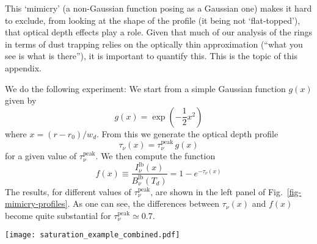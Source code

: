 \documentclass{aa}
\begin{document}
This `mimicry' (a non-Gaussian function posing as a Gaussian one) makes it hard
to exclude, from looking at the shape of the profile (it being not
`flat-topped'), that optical depth effects play a role. Given that much of our
analysis of the rings in terms of dust trapping relies on the optically thin
approximation (``what you see is what is there''), it is important to
quantify this. This is the topic of this appendix.

We do the following experiment: We start from a simple Gaussian function
$g(x)$ given by
\begin{equation}\label{eq-mimicry-underlying-gauss}
g(x) = \exp\left(-\frac{1}{2}x^2\right)
\end{equation}
where $x=(r-r_0)/w_d$. From this we generate the optical depth profile
\begin{equation}
\tau_\nu(x) = \tau_\nu^{\mathrm{peak}}\,g(x)
\end{equation}
for a given value of $\tau_\nu^{\mathrm{peak}}$. We then compute the function
\begin{equation}
  f(x) \equiv \frac{I_\nu^{\mathrm{lb}}(x)}{B_\nu^{\mathrm{lb}}(T_d)}
  = 1-e^{-\tau_\nu(x)}
\end{equation}
The results, for different values of $\tau_\nu^{\mathrm{peak}}$, are shown in
the left panel of Fig.~\ref{fig-mimicry-profiles}. As one can see, the
differences between $\tau_\nu(x)$ and $f(x)$ become quite substantial for
$\tau_\nu^{\mathrm{peak}}\simeq 0.7$.

\begin{figure*}
\centerline{\texttt{[image: saturation\_example\_combined.pdf]}}
\caption{\label{fig-mimicry-profiles}Demonstration of the Gaussian 'mimicry'
  effect discussed in Appendix \ref{sec-mimicry-flat-topped}. Left panel:
  Profiles before beam-convolution. Solid curves show the radiative transfer
  result $f(x)=1-e^{-\tau_\nu(x)}$, dotted curves show the underlying
  $\tau_\nu(x)$.  Middle panel is the same, but convolved with a beam that is
  half the width of the Gaussian profile of $\tau_\nu(x)$. Right panel: Solid
  lines are the same as for the middle panel, but the dashed lines are the best
  fit Gaussian curves (also convolved with the beam).}
\end{figure*}
\end{document}
